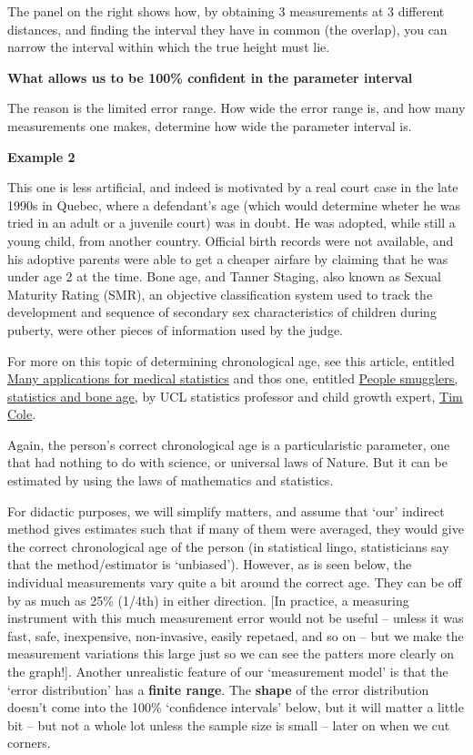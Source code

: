 \documentclass[
]{article}
\begin{document}
The panel on the right shows how, by obtaining 3 measurements at 3
different distances, and finding the interval they have in common (the
overlap), you can narrow the interval within which the true height must
lie.

\textbf{What allows us to be 100\% confident in the parameter interval}

The reason is the limited error range. How wide the error range is, and
how many measurements one makes, determine how wide the parameter
interval is.

\textbf{Example 2}

This one is less artificial, and indeed is motivated by a real court
case in the late 1990s in Quebec, where a defendant's age (which would
determine wheter he was tried in an adult or a juvenile court) was in
doubt. He was adopted, while still a young child, from another country.
Official birth records were not available, and his adoptive parents were
able to get a cheaper airfare by claiming that he was under age 2 at the
time. Bone age, and Tanner Staging, also known as Sexual Maturity Rating
(SMR), an objective classification system used to track the development
and sequence of secondary sex characteristics of children during
puberty, were other pieces of information used by the judge.

For more on this topic of determining chronological age, see this
article, entitled
\href{https://discovery.ucl.ac.uk/id/eprint/1470308/1/Tim_Cole_Intl_Innovation_140_Research_Media.pdf}{Many
applications for medical statistics} and thos one, entitled
\href{https://rss.onlinelibrary.wiley.com/doi/full/10.1111/j.1740-9713.2012.00568.x}{People
smugglers, statistics and bone age}, by UCL statistics professor and
child growth expert,
\href{https://scholar.google.com/citations?user=1P_yQocAAAAJ\&hl=en}{Tim
Cole}.

Again, the person's correct chronological age is a particularistic
parameter, one that had nothing to do with science, or universal laws of
Nature. But it can be estimated by using the laws of mathematics and
statistics.

For didactic purposes, we will simplify matters, and assume that `our'
indirect method gives estimates such that if many of them were averaged,
they would give the correct chronological age of the person (in
statistical lingo, statisticians say that the method/estimator is
`unbiased'). However, as is seen below, the individual measurements vary
quite a bit around the correct age. They can be off by as much as 25\%
(1/4th) in either direction. {[}In practice, a measuring instrument with
this much measurement error would not be useful -- unless it was fast,
safe, inexpensive, non-invasive, easily repetaed, and so on -- but we
make the measurement variations this large just so we can see the
patters more clearly on the graph!{]}. Another unrealistic feature of
our `measurement model' is that the `error distribution' has a
\textbf{finite range}. The \textbf{shape} of the error distribution
doesn't come into the 100\% `confidence intervals' below, but it will
matter a little bit -- but not a whole lot unless the sample size is
small -- later on when we cut corners.
\end{document}
